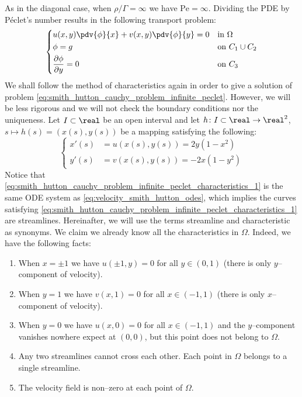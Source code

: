 As in the diagonal case, when $\rho / \Gamma = \infty$ we have $\mathrm{Pe} = \infty$. Dividing the PDE by Péclet's number results in the following transport problem:
\begin{equation} \label{eq:smith_hutton_cauchy_problem_infinite_peclet} 
	\left\{
	\begin{aligned}
		&u(x,y) \pdv{\phi}{x} + v(x,y) \pdv{\phi}{y} = 0 &
		&\text{in } \Omega \\
		&\phi = g & 
		&\text{on } C_1 \cup C_2 \\
		&\frac{\partial \phi}{\partial y} = 0 & 
		&\text{on } C_3
	\end{aligned}
	\right.
\end{equation}
We shall follow the method of characteristics again in order to give a solution of problem \eqref{eq:smith_hutton_cauchy_problem_infinite_peclet}. However, we will be less rigorous and we will not check the boundary conditions nor the uniqueness. Let $I \subset \real$ be an open interval and let $h \colon I \subset \real \to \real^2$, $s \mapsto h(s) = (x(s), y(s))$ be a mapping satisfying the following:
\begin{equation} \label{eq:smith_hutton_cauchy_problem_infinite_peclet_characteristics_1} 
	\left\{
	\begin{aligned}
		x'(s) &= u(x(s), y(s)) = 2 y (1 - x^2) \\
		y'(s) &= v(x(s), y(s)) = - 2 x (1 - y^2)
	\end{aligned}
	\right.
\end{equation}
Notice that \eqref{eq:smith_hutton_cauchy_problem_infinite_peclet_characteristics_1} is the same ODE system as \eqref{eq:velocity_smith_hutton_odes}, which implies the curves satisfying \eqref{eq:smith_hutton_cauchy_problem_infinite_peclet_characteristics_1} are streamlines. Hereinafter, we will use the terms streamline and characteristic as synonyms. We claim we already know all the characteristics in $\Omega$. Indeed, we have the following facts:
\begin{enumerate}[label={(\roman*)}, topsep=0pt] \label{lab:smith_hutton_cauchy_problem_infinite_peclet_i}
	\item When $x = \pm 1$ we have $u(\pm 1, y) = 0$ for all $y \in (0, 1)$ (there is only $y$--component of velocity). \label{lab:smith_hutton_cauchy_problem_infinite_peclet_x}
	\item When $y = 1$ we have $v(x, 1) = 0$ for all $x \in (-1,1)$ (there is only $x$--component of velocity). \label{lab:smith_hutton_cauchy_problem_infinite_peclet_y}
	\item When $y = 0$ we have $u(x,0) = 0$ for all $x \in (-1,1)$ and the $y$--component vanishes nowhere expect at $(0,0)$, but this point does not belong to $\Omega$. \label{lab:smith_hutton_cauchy_problem_infinite_peclet_iv}
	\item Any two streamlines cannot cross each other. Each point in $\Omega$ belongs to a single streamline. \label{lab:smith_hutton_cauchy_problem_infinite_peclet_v}
	\item The velocity field is non--zero at each point of $\Omega$.
\end{enumerate}
